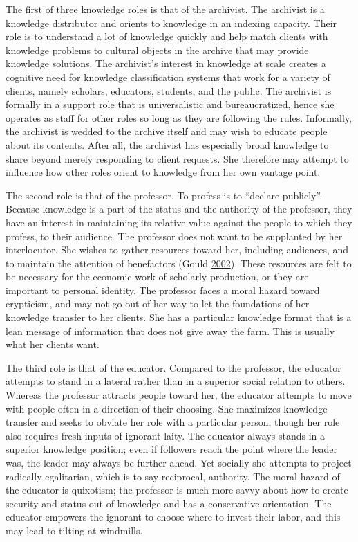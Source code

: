 \documentclass[]{book}
\theoremstyle{definition}
\theoremstyle{definition}
\theoremstyle{definition}
\theoremstyle{remark}
\begin{document}
The first of three knowledge roles is that of the archivist. The
archivist is a knowledge distributor and orients to knowledge in an
indexing capacity. Their role is to understand a lot of knowledge
quickly and help match clients with knowledge problems to cultural
objects in the archive that may provide knowledge solutions. The
archivist's interest in knowledge at scale creates a cognitive need for
knowledge classification systems that work for a variety of clients,
namely scholars, educators, students, and the public. The archivist is
formally in a support role that is universalistic and bureaucratized,
hence she operates as staff for other roles so long as they are
following the rules. Informally, the archivist is wedded to the archive
itself and may wish to educate people about its contents. After all, the
archivist has especially broad knowledge to share beyond merely
responding to client requests. She therefore may attempt to influence
how other roles orient to knowledge from her own vantage point.

The second role is that of the professor. To profess is to ``declare
publicly''. Because knowledge is a part of the status and the authority
of the professor, they have an interest in maintaining its relative
value against the people to which they profess, to their audience. The
professor does not want to be supplanted by her interlocutor. She wishes
to gather resources toward her, including audiences, and to maintain the
attention of benefactors (Gould
\protect\hyperlink{ref-Gould2002Origins}{2002}). These resources are
felt to be necessary for the economic work of scholarly production, or
they are important to personal identity. The professor faces a moral
hazard toward crypticism, and may not go out of her way to let the
foundations of her knowledge transfer to her clients. She has a
particular knowledge format that is a lean message of information that
does not give away the farm. This is usually what her clients want.

The third role is that of the educator. Compared to the professor, the
educator attempts to stand in a lateral rather than in a superior social
relation to others. Whereas the professor attracts people toward her,
the educator attempts to move with people often in a direction of their
choosing. She maximizes knowledge transfer and seeks to obviate her role
with a particular person, though her role also requires fresh inputs of
ignorant laity. The educator always stands in a superior knowledge
position; even if followers reach the point where the leader was, the
leader may always be further ahead. Yet socially she attempts to project
radically egalitarian, which is to say reciprocal, authority. The moral
hazard of the educator is quixotism; the professor is much more savvy
about how to create security and status out of knowledge and has a
conservative orientation. The educator empowers the ignorant to choose
where to invest their labor, and this may lead to tilting at windmills.
\end{document}
